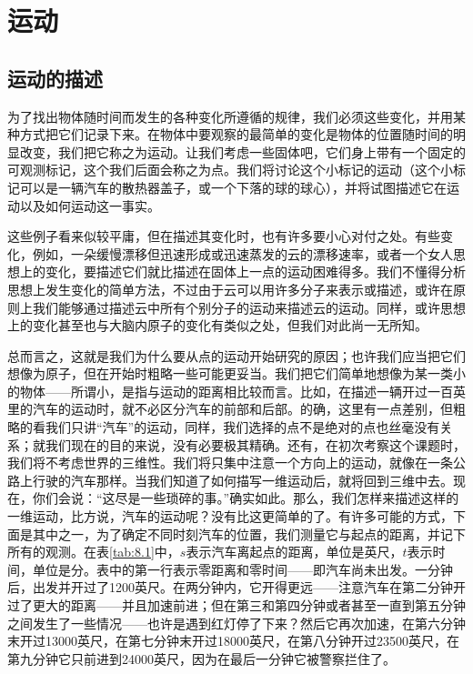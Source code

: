 \chapter{运动}

\section{运动的描述}

为了找出物体随时间而发生的各种变化所遵循的规律，我们必须这些变化，并用某种方式把它们记录下来。在物体中要观察的最简单的变化是物体的位置随时间的明显改变，我们把它称之为运动。让我们考虑一些固体吧，它们身上带有一个固定的可观测标记，这个我们后面会称之为点。我们将讨论这个小标记的运动（这个小标记可以是一辆汽车的散热器盖子，或一个下落的球的球心），并将试图描述它在运动以及如何运动这一事实。

这些例子看来似较平庸，但在描述其变化时，也有许多要小心对付之处。有些变化，例如，一朵缓慢漂移但迅速形成或迅速蒸发的云的漂移速率，或者一个女人思想上的变化，要描述它们就比描述在固体上一点的运动困难得多。我们不懂得分析思想上发生变化的简单方法，不过由于云可以用许多分子来表示或描述，或许在原则上我们能够通过描述云中所有个别分子的运动来描述云的运动。同样，或许思想上的变化甚至也与大脑内原子的变化有类似之处，但我们对此尚一无所知。

总而言之，这就是我们为什么要从点的运动开始研究的原因；也许我们应当把它们想像为原子，但在开始时粗略一些可能更妥当。我们把它们简单地想像为某一类小的物体——所谓小，是指与运动的距离相比较而言。比如，在描述一辆开过一百英里的汽车的运动时，就不必区分汽车的前部和后部。的确，这里有一点差别，但粗略的看我们只讲“汽车”的运动，同样，我们选择的点不是绝对的点也丝毫没有关系；就我们现在的目的来说，没有必要极其精确。还有，在初次考察这个课题时，我们将不考虑世界的三维性。我们将只集中注意一个方向上的运动，就像在一条公路上行驶的汽车那样。当我们知道了如何描写一维运动后，就将回到三维中去。现在，你们会说：“这尽是一些琐碎的事。”确实如此。那么，我们怎样来描述这样的一维运动，比方说，汽车的运动呢？没有比这更简单的了。有许多可能的方式，下面是其中之一，为了确定不同时刻汽车的位置，我们测量它与起点的距离，并记下所有的观测。在表\ref{tab:8.1}中，$s$表示汽车离起点的距离，单位是英尺，$t$表示时间，单位是分。表中的第一行表示零距离和零时间——即汽车尚未出发。一分钟后，出发并开过了1200英尺。在两分钟内，它开得更远——注意汽车在第二分钟开过了更大的距离——并且加速前进；但在第三和第四分钟或者甚至一直到第五分钟之间发生了一些情况——也许是遇到红灯停了下来？然后它再次加速，在第六分钟末开过13000英尺，在第七分钟末开过18000英尺，在第八分钟开过23500英尺，在第九分钟它只前进到24000英尺，因为在最后一分钟它被警察拦住了。

